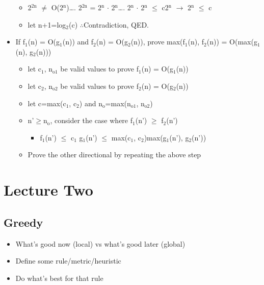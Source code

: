 \documentclass[11pt]{article}
\begin{document}
\begin{itemize}
\begin{itemize}
\item 2\(^{\text{2n}}\) \(\ne\) O(2\(^{\text{n}}\))\ldots{}. 2\(^{\text{2n}}\) = 2\(^{\text{n}}\) \(\cdot\) 2\(^{\text{n}}\)\ldots{}. 2\(^{\text{n}}\) \(\cdot\) 2\(^{\text{n}}\) \(\le\) c2\(^{\text{n}}\) \(\rightarrow\) 2\(^{\text{n}}\) \(\le\) c
\item let n+1=log\(_{\text{2}}\)(c) \(\therefore\)Contradiction, QED.
\end{itemize}
\item If f\(_{\text{1}}\)(n) = O(g\(_{\text{1}}\)(n)) and f\(_{\text{2}}\)(n) = O(g\(_{\text{2}}\)(n)), prove max(f\(_{\text{1}}\)(n), f\(_{\text{2}}\)(n)) = O(max(g\(_{\text{1}}\)(n), g\(_{\text{2}}\)(n)))
\begin{itemize}
\item let c\(_{\text{1}}\), n\(_{\text{o1}}\) be valid values to prove f\(_{\text{1}}\)(n) = O(g\(_{\text{1}}\)(n))
\item let c\(_{\text{2}}\), n\(_{\text{o2}}\) be valid values to prove f\(_{\text{2}}\)(n) = O(g\(_{\text{2}}\)(n))
\item let c=max(c\(_{\text{1}}\), c\(_{\text{2}}\)) and n\(_{\text{o}}\)=max(n\(_{\text{o1}}\), n\(_{\text{o2}}\))
\item n'\(\ge\)n\(_{\text{o}}\), consider the case where f\(_{\text{1}}\)(n') \(\ge\) f\(_{\text{2}}\)(n')
\begin{itemize}
\item f\(_{\text{1}}\)(n') \(\le\) c\(_{\text{1}}\) g\(_{\text{1}}\)(n') \(\le\) max(c\(_{\text{1}}\), c\(_{\text{2}}\))max(g\(_{\text{1}}\)(n'), g\(_{\text{2}}\)(n'))
\end{itemize}
\item Prove the other directional by repeating the above step
\end{itemize}
\end{itemize}
\section*{Lecture Two}
\label{sec:org2cdd144}
\subsection*{Greedy}
\label{sec:org727d557}
\begin{itemize}
\item What's good now (local) vs what's good later (global)
\item Define some rule/metric/heuristic
\item Do what's best for that rule
\end{itemize}
\end{document}
